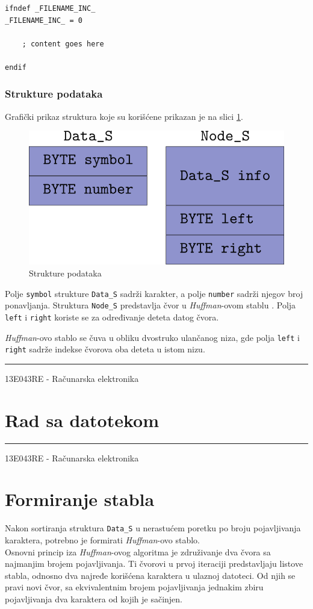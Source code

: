 \documentclass[a4paper, 12pt]{article}
\newcommand{\btmline}{
\vfill
\rule{0.9\textwidth}{0.4mm}
\begin{center}
13E043RE - Računarska elektronika
\end{center}}
\newcommand{\Huff}{\emph{Huffman}}
\begin{document}
\begin{verbatim}
ifndef _FILENAME_INC_
_FILENAME_INC_ = 0

	; content goes here
	
endif
\end{verbatim}

\subsubsection*{Strukture podataka}
Grafički prikaz struktura koje su korišćene prikazan je na slici \ref{struct}. 

\begin{figure}[h!]
\centering
\includegraphics[width=.5\textwidth]{structures}
\caption{Strukture podataka}
\label{struct}
\end{figure}

Polje \verb|symbol| strukture \verb|Data_S| sadrži karakter, a polje \verb|number| sadrži njegov broj ponavljanja.
Struktura \verb|Node_S| predstavlja čvor u \textit{Huffman}-ovom stablu . Polja \verb|left| i \verb|right| koriste se 
za određivanje deteta datog čvora. 

\Huff-ovo stablo se čuva u obliku dvostruko ulančanog niza, gde polja \verb|left| i \verb|right| sadrže indekse čvorova oba deteta u istom nizu.

\btmline\newpage

\section*{Rad sa datotekom}



\btmline\newpage
\section*{Formiranje stabla}
Nakon sortiranja struktura \verb|Data_S| u nerastućem poretku po broju pojavljivanja karaktera, potrebno je formirati \emph{Huffman}-ovo stablo. \\
Osnovni princip iza \Huff-ovog algoritma je združivanje dva čvora sa najmanjim brojem pojavljivanja. Ti čvorovi u prvoj iteraciji predstavljaju listove stabla, odnosno dva najređe korišćena karaktera u ulaznoj datoteci. Od njih se pravi novi čvor, sa ekvivalentnim brojem pojavljivanja jednakim zbiru pojavljivanja dva karaktera od kojih je sačinjen.
\end{document}
